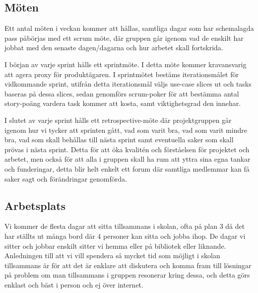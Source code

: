 \documentclass[11pt]{article}
\begin{document}
\subsection{Möten}
\label{sec:orgd6bbd27}
Ett antal möten i veckan kommer att hållas, samtliga dagar som har
schemalagda pass påbörjas med ett scrum möte, där gruppen går igenom vad
de enskilt har jobbat med den senaste dagen/dagarna och hur arbetet
skall fortskrida.

I början av varje sprint hålls ett sprintmöte. I detta möte kommer
kravansvarig att agera proxy för produktägaren. I sprintmötet bestäms
iterationsmålet för vidkommande sprint, utifrån detta iterationsmål
väljs use-case slices ut och tasks baseras på dessa slices, sedan
genomförs scrum-poker för att bestämma antal story-poäng vardera task
kommer att kosta, samt viktighetsgrad den innehar.

I slutet av varje sprint hålls ett retrospective-möte där projektgruppen
går igenom hur vi tycker att sprinten gått, vad som varit bra, vad som
varit mindre bra, vad som skall behållas till nästa sprint samt
eventuella saker som skall prövas i nästa sprint. Detta för att öka
kvalitén och förståelsen för projektet och arbetet, men också för att
alla i gruppen skall ha rum att yttra sina egna tankar och funderingar,
detta blir helt enkelt ett forum där samtliga medlemmar kan få saker
sagt och förändringar genomförda.

\subsection{Arbetsplats}
\label{sec:org6d1c9c4}
Vi kommer de flesta dagar att sitta tillsammans i skolan, ofta på plan 3
då det har ställts ut många bord där 4 personer kan sitta och jobba
ihop. De dagar vi sitter och jobbar enskilt sitter vi hemma eller på
bibliotek eller liknande. Anledningen till att vi vill spendera så
mycket tid som möjligt i skolan tillsammans är för att det är enklare
att diskutera och komma fram till lösningar på problem om man
tillsammans i gruppen resonerar kring dessa, och detta görs enklast och
bäst i person och ej över internet.
\end{document}
